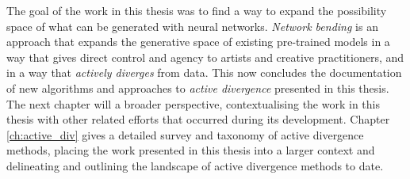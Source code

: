 The goal of the work in this thesis was to find a way to expand the possibility space of what can be generated with neural networks.
\textit{Network bending} is an approach that expands the generative space of existing pre-trained models in a way that gives direct control and agency to artists and creative practitioners, and in a way that \textit{actively diverges} from data.
This now concludes the documentation of new algorithms and approaches to \textit{active divergence} presented in this thesis. 
The next chapter will a broader perspective, contextualising the work in this thesis with other related efforts that occurred during its development.
Chapter \ref{ch:active_div} gives a detailed survey and taxonomy of active divergence methods, placing the work presented in this thesis into a larger context and delineating and outlining the landscape of active divergence methods to date. 
